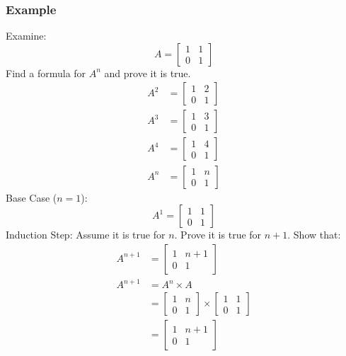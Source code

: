 \documentclass[letterpaper, 12pt]{math}
\begin{document}
\subsubsection*{Example}
Examine:
\[ A = \begin{bmatrix}1 & 1 \\ 0 & 1\end{bmatrix} \]
Find a formula for \( A^n \) and prove it is true.
\begin{align*}
  A^2 &= \begin{bmatrix}1 & 2 \\ 0 & 1\end{bmatrix} \\
  A^3 &= \begin{bmatrix}1 & 3 \\ 0 & 1\end{bmatrix} \\
  A^4 &= \begin{bmatrix}1 & 4 \\ 0 & 1\end{bmatrix} \\
  A^n &= \begin{bmatrix}1 & n \\ 0 & 1\end{bmatrix}
\end{align*}
Base Case (\(n = 1\)):
\[ A^1 = \begin{bmatrix}1 & 1 \\ 0 & 1\end{bmatrix} \]
Induction Step: Assume it is true for \( n \). Prove it is true for \( n+1 \).
Show that:
\begin{align*}
  A^{n+1} &= \begin{bmatrix}
    1 & n+1 \\
    0 & 1
  \end{bmatrix} \\
  A^{n+1} &= A^n\times A \\
  &= \begin{bmatrix}
    1 & n \\
    0 & 1
  \end{bmatrix}\times\begin{bmatrix}
    1 & 1 \\
    0 & 1
  \end{bmatrix} \\
  &= \begin{bmatrix}
    1 & n+1 \\
    0 & 1
  \end{bmatrix}
\end{align*}
\end{document}
